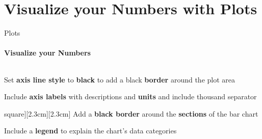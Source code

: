 \documentclass[aspectratio=169]{beamer}
\begin{document}
\section{Visualize your Numbers with \textbf{Plots}}

\begin{frame}
\end{frame}

\begin{frame}{Plots}
    \framesubtitle{Visualize your Numbers}

    \vspace{-1.1cm}
    \begin{columns}
        \begin{column}{0.49\textwidth}
            \begin{coloredblockleft}
                \footnotesize
                Set \textbf{axis line style} to \textbf{black} to add a black \textbf{border} around the plot area
            \end{coloredblockleft}
            \vspace{-0.1cm}
            \begin{coloredblockleft}
                \footnotesize
                Include \textbf{axis labels} with descriptions and \textbf{units} and include thousand separator
            \end{coloredblockleft}
            \vspace{-0.1cm}
            \begin{coloredblockleft}[grey][\large\faIcon[regular]{square}][2.3cm][2.3cm]
                \footnotesize
                Add a \textbf{black border} around the \textbf{sections} of the bar chart
            \end{coloredblockleft}
            \vspace{-0.1cm}
            \begin{coloredblockleft}
                \footnotesize
                Include a \textbf{legend} to explain the chart's data categories
            \end{coloredblockleft}
            \vspace{-0.1cm}

\end{column}
\end{columns}
\end{frame}
\end{document}
